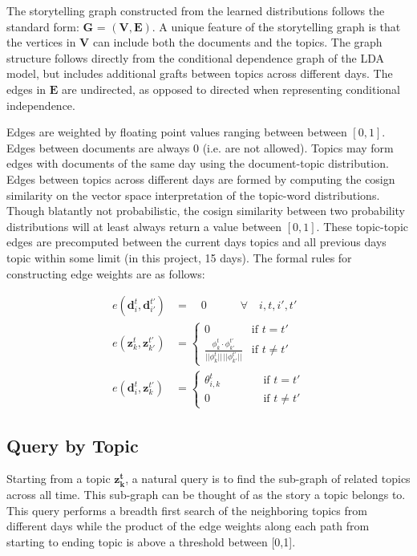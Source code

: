 \documentclass[10pt]{article}
\begin{document}
The storytelling graph constructed from the learned distributions follows the standard form: $\mathbf{G}$ = $(\mathbf{V}, \mathbf{E})$.  A unique feature of the storytelling graph is that the vertices in $\mathbf{V}$ can include both the documents and the topics.  The graph structure follows directly from the conditional dependence graph of the LDA model, but includes additional grafts between topics across different days.  The edges in $\mathbf{E}$ are undirected, as opposed to directed when representing conditional independence.

Edges are weighted by floating point values ranging between between $[0, 1]$.  Edges between documents are always 0 (i.e. are not allowed).  Topics may form edges with documents of the same day using the document-topic distribution.  Edges between topics across different days are formed by computing the cosign similarity on the vector space interpretation of the topic-word distributions.  Though blatantly not probabilistic, the cosign similarity between two probability distributions will at least always return a value between $[0,1]$. These topic-topic edges are precomputed between the current days topics and all previous days topic within some limit (in this project, 15 days).  The formal rules for constructing edge weights are as follows:  

\begin{align}
  e(\mathbf{d}_i^t, \mathbf{d}_{i'}^{t'}) &= \quad 0 \qquad\quad \forall \quad i, t, i', t'\\
  e(\mathbf{z}_k^t, \mathbf{z}_{k'}^{t'}) &= \begin{cases}
      0 & \text{if $t=t'$} \\
      \frac{\phi_k^t \cdot \phi_{k'}^{t'}}{||\phi_k^t||\,||\phi_{k'}^{t'}||} & \text{if $t \ne t'$}
    \end{cases} \\
  e(\mathbf{d}_i^t, \mathbf{z}_{k}^{t'}) &= \begin{cases}
      \theta_{i,k}^t & \qquad\quad \text{if $t =t'$} \\
      0 & \qquad\quad \text{if $t \ne t'$}
    \end{cases}
\end{align}

\subsection {Query by Topic}

Starting from a topic $\mathbf{z_k^t}$, a natural query is to find the sub-graph of related topics across all time.  This sub-graph can be thought of as the story a topic belongs to.  This query performs a breadth first search of the neighboring topics from different days while the product of the edge weights along each path from starting to ending topic is above a threshold between [0,1].   
\end{document}
